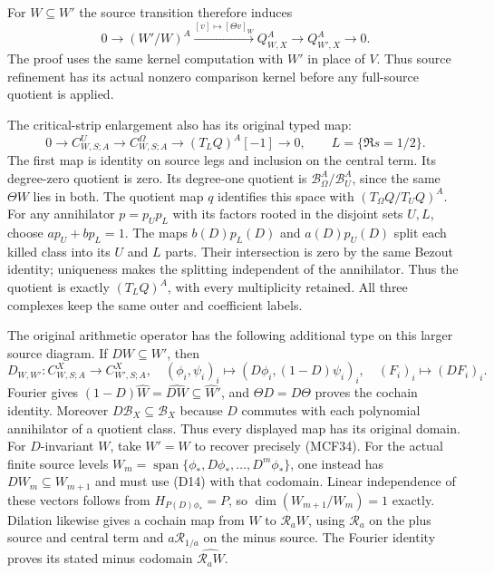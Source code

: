 For $W\subseteq W'$ the source transition therefore induces
\[
0\longrightarrow(W'/W)^A\xrightarrow{[v]\mapsto[\Theta v]_W}
 Q_{W,X}^A\longrightarrow Q_{W',X}^A\longrightarrow0.
\tag{D12}
\]
The proof uses the same kernel computation with $W'$ in place of
$V$.  Thus source refinement has its actual nonzero comparison
kernel before any full-source quotient is applied.

The critical-strip enlargement also has its original typed map:
\[
0\longrightarrow C_{W,S;A}^{U}\longrightarrow C_{W,S;A}^{\Omega}
 \longrightarrow(T_LQ)^A[-1]\longrightarrow0,
\qquad L=\{\Re s=1/2\}.
\tag{D13}
\]
The first map is identity on source legs and inclusion on the
central term.  Its degree-zero quotient is zero.  Its degree-one
quotient is $\mathscr B_\Omega^A/\mathscr B_U^A$, since the same
$\Theta W$ lies in both.  The quotient map $q$ identifies this
space with $(T_\Omega Q/T_UQ)^A$.  For any annihilator
$p=p_Up_L$ with its factors rooted in the disjoint sets $U,L$,
choose $ap_U+bp_L=1$.  The maps $b(D)p_L(D)$ and $a(D)p_U(D)$
split each killed class into its $U$ and $L$ parts.  Their
intersection is zero by the same Bezout identity; uniqueness makes
the splitting independent of the annihilator.  Thus the quotient
is exactly $(T_LQ)^A$, with every multiplicity retained.  All
three complexes keep the same outer and coefficient labels.

The original arithmetic operator has the following additional
type on this larger source diagram.  If $DW\subseteq W'$, then
\[
D_{W,W'}:C_{W,S;A}^X\longrightarrow C_{W',S;A}^X,
\quad(\phi_i,\psi_i)_i\longmapsto(D\phi_i,(1-D)\psi_i)_i,
\quad(F_i)_i\longmapsto(DF_i)_i.
\tag{D14}
\]
Fourier gives $(1-D)\widehat W=\widehat{DW}\subseteq\widehat W'$,
and $\Theta D=D\Theta$ proves the cochain identity.  Moreover
$D\mathscr B_X\subseteq\mathscr B_X$ because $D$ commutes with
each polynomial annihilator of a quotient class.  Thus every
displayed map has its original domain.  For $D$-invariant $W$,
take $W'=W$ to recover precisely (MCF34).  For the actual finite
source levels $W_m=\operatorname{span}\{\phi_*,D\phi_*,\ldots,D^m\phi_*\}$,
one instead has $DW_m\subseteq W_{m+1}$ and must use (D14) with
that codomain.  Linear independence of these vectors follows from
$H_{P(D)\phi_*}=P$, so $\dim(W_{m+1}/W_m)=1$ exactly.
Dilation likewise gives a cochain map from $W$ to $\mathcal R_aW$,
using $\mathcal R_a$ on the plus source and central term and
$a\mathcal R_{1/a}$ on the minus source.  The Fourier identity
proves its stated minus codomain $\widehat{\mathcal R_aW}$.
